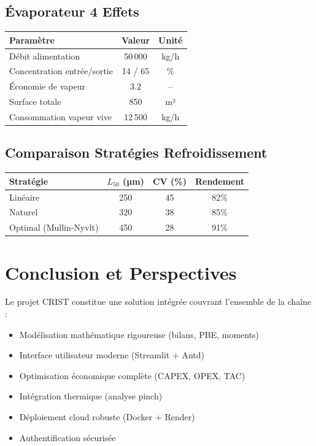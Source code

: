 \documentclass[12pt,a4paper,twoside]{article}
\begin{document}
\subsection{Évaporateur 4 Effets}

\begin{table}[htbp]
\centering
\begin{tabular}{lcc}
\toprule
\textbf{Paramètre} & \textbf{Valeur} & \textbf{Unité} \\
\midrule
Débit alimentation & 50\,000 & kg/h \\
Concentration entrée/sortie & 14 / 65 & \% \\
Économie de vapeur & 3.2 & -- \\
Surface totale & 850 & m² \\
Consommation vapeur vive & 12\,500 & kg/h \\
\bottomrule
\end{tabular}
\end{table}

\subsection{Comparaison Stratégies Refroidissement}

\begin{table}[htbp]
\centering
\begin{tabular}{lccc}
\toprule
\textbf{Stratégie} & \textbf{$L_{50}$ (µm)} & \textbf{CV (\%)} & \textbf{Rendement} \\
\midrule
Linéaire & 250 & 45 & 82\% \\
Naturel & 320 & 38 & 85\% \\
Optimal (Mullin-Nyvlt) & 450 & 28 & 91\% \\
\bottomrule
\end{tabular}
\end{table}

\section{Conclusion et Perspectives}

\lettrine[lines=2]{L}{}e projet CRIST constitue une solution intégrée couvrant l'ensemble de la chaîne :

\begin{itemize}[noitemsep]
    \item Modélisation mathématique rigoureuse (bilans, PBE, moments)
    \item Interface utilisateur moderne (Streamlit + Antd)
    \item Optimisation économique complète (CAPEX, OPEX, TAC)
    \item Intégration thermique (analyse pinch)
    \item Déploiement cloud robuste (Docker + Render)
    \item Authentification sécurisée
\end{itemize}
\end{document}
